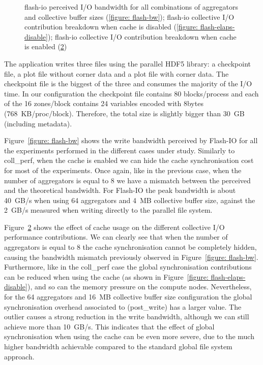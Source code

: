 \begin{figure}[!htb]
\begin{subfigure}[b]{\textwidth}
  \caption{}
  \label{figure: flash-elaps-enable}
  \end{subfigure}
  \caption{flash-io perceived I/O bandwidth for all combinations of aggregators and collective buffer sizes (\ref{figure: flash-bw}); flash-io collective I/O contribution breakdown when cache is disabled (\ref{figure: flash-elaps-disable}); flash-io 
  collective I/O contribution breakdown when cache is enabled (\ref{figure: flash-elaps-enable})}
\end{figure}
The application writes three files using the parallel HDF5 library: a checkpoint file, a plot file without corner data and a plot file with corner data. The checkpoint file is the biggest of the three and consumes the majority of the I/O time. In our 
configuration the checkpoint file contains 80 blocks/process and each of the 16 zones/block contains 24 variables encoded with 8bytes (768~KB/proc/block). Therefore, the total size is slightly bigger than 30~GB (including metadata).

Figure~\ref{figure: flash-bw} shows the write bandwidth perceived by Flash-IO for all the experiments performed in the different cases under study. Similarly to coll\_perf, when the cache is enabled we can hide the cache synchronisation cost for most of 
the experiments. Once again, like in the previous case, when the number of aggregators is equal to 8 we have a mismatch between the perceived and the theoretical bandwidth. For Flash-IO the peak bandwidth is about 40~GB/s when using 64 aggregators and 4~MB 
collective buffer size, against the 2~GB/s measured when writing directly to the parallel file system.

Figure~\ref{figure: flash-elaps-enable} shows the effect of cache usage on the different collective I/O performance contributions. We can clearly see that when the number of aggregators is equal to 8 the cache synchronisation cannot be completely hidden, 
causing the bandwidth mismatch previously observed in Figure~\ref{figure: flash-bw}. Furthermore, like in the coll\_perf case the global synchronisation contributions can be reduced when using the cache (as shown in Figure~\ref{figure: flash-elaps-disable}), 
and so can the memory pressure on the compute nodes. Nevertheless, for the 64 aggregators and 16~MB collective buffer size configuration the global synchronisation overhead associated to  (post\_write) has a larger value. The outlier 
causes a strong reduction in the write bandwidth, although we can still achieve more than 10~GB/s. This indicates that the effect of global synchronisation when using the cache can be even more severe, due to the much higher bandwidth achievable compared to 
the standard global file system approach.

